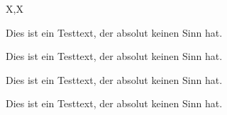 \documentclass[a3paper,scifiposter,style=scifi]{tubsposter}
\begin{document}
\begin{tubsposter}{X,X}
  \begin{posterrow}[5cm,X]
    \begin{postercol}
      Dies ist ein Testtext, der absolut keinen Sinn hat.
    \end{postercol}
    \begin{postercol}
      Dies ist ein Testtext, der absolut keinen Sinn hat.
    \end{postercol}
  \end{posterrow}
  \begin{posterrow}[5cm,X]
    \begin{postercol}
      Dies ist ein Testtext, der absolut keinen Sinn hat.
    \end{postercol}
    \begin{postercol}
      Dies ist ein Testtext, der absolut keinen Sinn hat.
    \end{postercol}
  \end{posterrow}
\end{tubsposter}
~
\newpage
\end{document}
